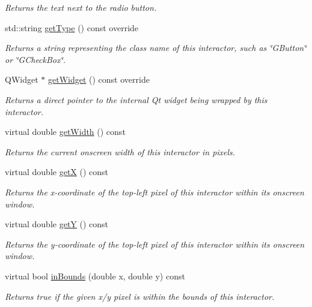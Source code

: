 \begin{DoxyCompactItemize}
\begin{DoxyCompactList}\small\item\em Returns the text next to the radio button. \end{DoxyCompactList}\item 
std\+::string \mbox{\hyperlink{classsgl_1_1GRadioButton_a9b72ede4ee8520f987a0c01e30654814}{get\+Type}} () const override
\begin{DoxyCompactList}\small\item\em Returns a string representing the class name of this interactor, such as \char`\"{}\+G\+Button\char`\"{} or \char`\"{}\+G\+Check\+Box\char`\"{}. \end{DoxyCompactList}\item 
Q\+Widget $\ast$ \mbox{\hyperlink{classsgl_1_1GRadioButton_a3b33a602b31a6b809d020535a59db3b4}{get\+Widget}} () const override
\begin{DoxyCompactList}\small\item\em Returns a direct pointer to the internal Qt widget being wrapped by this interactor. \end{DoxyCompactList}\item 
virtual double \mbox{\hyperlink{classsgl_1_1GInteractor_a0ed2965abd4f5701d2cadf71239faf19}{get\+Width}} () const
\begin{DoxyCompactList}\small\item\em Returns the current onscreen width of this interactor in pixels. \end{DoxyCompactList}\item 
virtual double \mbox{\hyperlink{classsgl_1_1GInteractor_a344385751bee0720059403940d57a13e}{getX}} () const
\begin{DoxyCompactList}\small\item\em Returns the x-\/coordinate of the top-\/left pixel of this interactor within its onscreen window. \end{DoxyCompactList}\item 
virtual double \mbox{\hyperlink{classsgl_1_1GInteractor_aafa51c7f8f38a09febbb9ce7853f77b4}{getY}} () const
\begin{DoxyCompactList}\small\item\em Returns the y-\/coordinate of the top-\/left pixel of this interactor within its onscreen window. \end{DoxyCompactList}\item 
virtual bool \mbox{\hyperlink{classsgl_1_1GInteractor_afc480f652b8c5f1fb255e2269ce68879}{in\+Bounds}} (double x, double y) const
\begin{DoxyCompactList}\small\item\em Returns true if the given x/y pixel is within the bounds of this interactor. \end{DoxyCompactList}\item 

\end{DoxyCompactItemize}
